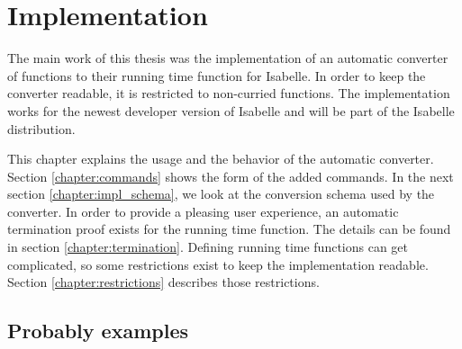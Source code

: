 
\chapter{Implementation}\label{chapter:impl}

The main work of this thesis was the implementation of an automatic converter of functions to their running time function for Isabelle.
In order to keep the converter readable, it is restricted to non-curried functions.
The implementation works for the newest developer version of Isabelle and will be part of the Isabelle distribution.

This chapter explains the usage and the behavior of the automatic converter.
Section \ref{chapter:commands} shows the form of the added commands.
In the next section \ref{chapter:impl_schema}, we look at the conversion schema used by the converter.
In order to provide a pleasing user experience, an automatic termination proof exists for the running time function.
The details can be found in section \ref{chapter:termination}.
Defining running time functions can get complicated, so some restrictions exist to keep the implementation readable.
Section \ref{chapter:restrictions} describes those restrictions.






\section{Probably examples}
